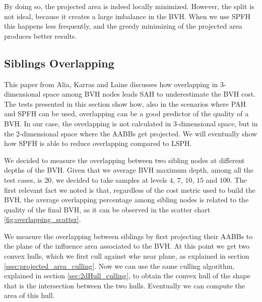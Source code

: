\documentclass{PoliMi_MasterThesis}
\begin{document}
By doing so, the projected area is indeed locally minimized. However, the split is not ideal, because it creates a large imbalance in the BVH. When we use SPFH this happens less frequently, and the greedy minimizing of the projected area produces better results.

\subsection{Siblings Overlapping} \label{ssec:siblings_overlapping}
This paper \cite{bvh_overlapping_metric} from Alia, Karras and Laine discusses how overlapping in 3-dimensional space among BVH nodes leads SAH to underestimate the BVH cost. The tests presented in this section show how, also in the scenarios where PAH and SPFH can be used, overlapping can be a good predictor of the quality of a BVH. In our case, the overlapping is not calculated in 3-dimensional space, but in the 2-dimensional space where the AABBs get projected. We will eventually show how SPFH is able to reduce overlapping compared to LSPH.

We decided to measure the overlapping between two sibling nodes at different depths of the BVH. Given that we average BVH maximum depth, among all the test cases, is $20$, we decided to take samples at levels $4$, $7$, $10$, $15$ and $100$. The first relevant fact we noted is that, regardless of the cost metric used to build the BVH, the average overlapping percentage among sibling nodes is related to the quality of the final BVH, as it can be observed in the scatter chart \ref{fig:overlapping_scatter}.

We measure the overlapping between siblings by first projecting their AABBs to the plane of the influence area associated to the BVH. At this point we get two convex hulls, which we first cull against whe near plane, as explained in section \ref{ssec:projected_area_culling}. Now we can use the same culling algorithm, explained in section \ref{sec:2dHull_culling}, to obtain the convex hull of the shape that is the intersection between the two hulls. Eventually we can compute the area of this hull. 
\end{document}
